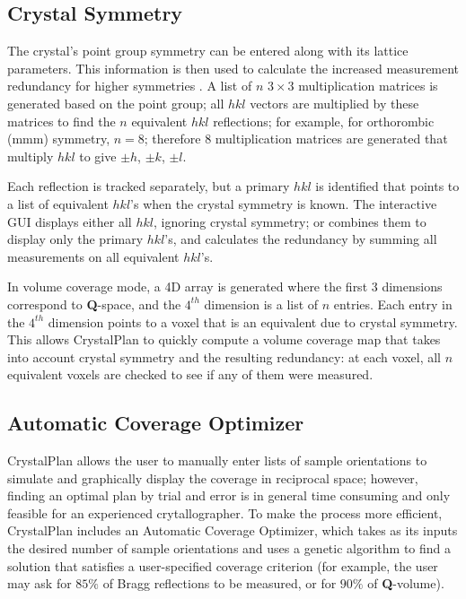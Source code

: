 \documentclass[final]{iucr}              %
\begin{document}
\subsection{Crystal Symmetry}
\label{sec:symm}
The crystal's point group symmetry can
be entered along with its lattice parameters.
This information is then used to
calculate the increased measurement redundancy for higher symmetries
\cite{giacovazzo92}. 
A list of $n$ $3\times3$ multiplication matrices is generated based on the point group; 
all $hkl$ vectors are multiplied by
these matrices to find the $n$ equivalent $hkl$ reflections; for example, for
orthorombic (mmm) symmetry, $n=8$; therefore 8 multiplication matrices are
generated that multiply $hkl$ to give $\pm h$, $\pm k$, $\pm l$.              

Each reflection is tracked separately, but a primary
$hkl$ is identified that points to a list of equivalent $hkl$'s when the
crystal symmetry is known.
The interactive GUI displays either all $hkl$, ignoring crystal symmetry; or
combines them to display only the primary $hkl$'s, and calculates the
redundancy by summing all measurements on all equivalent $hkl$'s.

In volume coverage mode, a 4D array is generated where the first 3 dimensions
correspond to {\bf Q}-space, and the $4^{th}$ dimension is a list of $n$
entries. Each entry in the $4^{th}$ dimension points to a voxel that is an
equivalent due to crystal symmetry. This allows CrystalPlan to quickly compute a volume coverage
map that takes into account crystal symmetry and the resulting redundancy: at
each voxel, all $n$ equivalent voxels are checked to see if any of them were
measured.



\subsection{Automatic Coverage Optimizer}

CrystalPlan allows the user to manually enter lists of sample orientations to
simulate and graphically display the coverage in reciprocal space;
however, finding an optimal plan by trial and error is in general 
time consuming and only feasible for an experienced crytallographer.
To make the process more efficient, CrystalPlan includes an Automatic
Coverage Optimizer, which takes as its inputs the desired number of sample
orientations and uses a genetic algorithm to find a solution that satisfies a
user-specified coverage criterion (for example, the user may ask for $85\%$ of 
Bragg reflections to be measured, or for $90\%$ of {\bf Q}-volume). 
\end{document}
